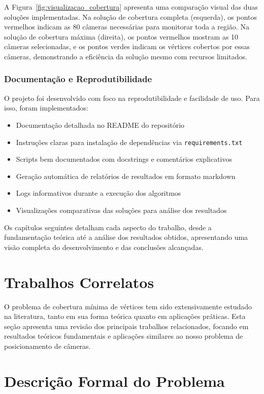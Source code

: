 \documentclass[12pt, a4paper]{report}
\begin{document}
A Figura~\ref{fig:visualizacao_cobertura} apresenta uma comparação visual das duas soluções implementadas. Na solução de cobertura completa (esquerda), os pontos vermelhos indicam as 80 câmeras necessárias para monitorar toda a região. Na solução de cobertura máxima (direita), os pontos vermelhos mostram as 10 câmeras selecionadas, e os pontos verdes indicam os vértices cobertos por essas câmeras, demonstrando a eficiência da solução mesmo com recursos limitados.

\subsection{Documentação e Reprodutibilidade}
O projeto foi desenvolvido com foco na reprodutibilidade e facilidade de uso. Para isso, foram implementados:

\begin{itemize}
    \item Documentação detalhada no README do repositório
    \item Instruções claras para instalação de dependências via \texttt{requirements.txt}
    \item Scripts bem documentados com docstrings e comentários explicativos
    \item Geração automática de relatórios de resultados em formato markdown
    \item Logs informativos durante a execução dos algoritmos
    \item Visualizações comparativas das soluções para análise dos resultados
\end{itemize}

Os capítulos seguintes detalham cada aspecto do trabalho, desde a fundamentação teórica até a análise dos resultados obtidos, apresentando uma visão completa do desenvolvimento e das conclusões alcançadas.

\chapter{Trabalhos Correlatos}
O problema de cobertura mínima de vértices tem sido extensivamente estudado na literatura, tanto em sua forma teórica quanto em aplicações práticas. Esta seção apresenta uma revisão dos principais trabalhos relacionados, focando em resultados teóricos fundamentais e aplicações similares ao nosso problema de posicionamento de câmeras.

\chapter{Descrição Formal do Problema}
\end{document}
